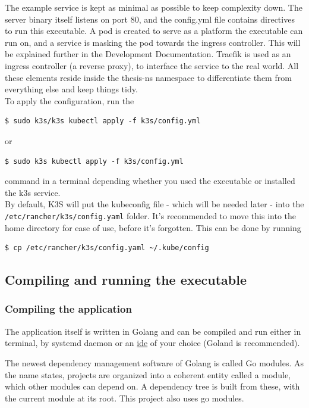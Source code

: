 The example service is kept as minimal as possible to keep complexity down. The server binary itself listens on port 80, and the config.yml file contains directives to run this executable. A pod is created to serve as a platform the executable can run on, and a service is masking the pod towards the ingress controller. This will be explained further in the Development Documentation. Traefik is used as an ingress controller (a reverse proxy), to interface the service to the real world. All these elements reside inside the thesis-ns namespace to differentiate them from everything else and keep things tidy. \\

\noindent
To apply the configuration, run the
\begin{verbatim}
$ sudo k3s/k3s kubectl apply -f k3s/config.yml
\end{verbatim}
or 
\begin{verbatim}
$ sudo k3s kubectl apply -f k3s/config.yml
\end{verbatim}
\noindent
command in a terminal depending whether you used the executable or installed the k3s service. \\

\label{sec:k3syaml}By default, K3S will put the kubeconfig file - which will be needed later - into the \texttt{/etc/rancher/k3s/config.yaml} folder. It's recommended to move this into the home directory for ease of use, before it's forgotten. This can be done by running
\begin{verbatim}
$ cp /etc/rancher/k3s/config.yaml ~/.kube/config
\end{verbatim}

\newpage
\subsection{Compiling and running the executable}
\subsubsection{Compiling the application}
The application itself is written in Golang and can be compiled and run either in terminal, by systemd\cite{systemd} daemon or an \underline{\gls{ide}} of your choice (Goland is recommended).

The newest dependency management software of Golang is called Go modules. As the name states, projects are organized into a coherent entity called a module, which other modules can depend on. A dependency tree is built from these, with the current module at its root. This project also uses go modules.

